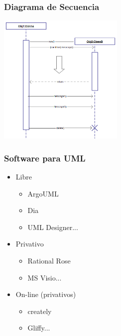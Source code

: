 \begin{frame}
\frametitle{Diagrama de Secuencia}

\begin{center}
\includegraphics[width=6cm]{figs/Sequence-diagram-UML.png}
\end{center}
  
\end{frame}

\begin{frame}
\frametitle{Software para UML}

\begin{itemize}
  \item Libre
  \begin{itemize}
    \item ArgoUML
    \item Dia
    \item UML Designer...
  \end{itemize}
  \item Privativo
    \begin{itemize}
    \item Rational Rose
    \item MS Visio...
  \end{itemize}
  \item On-line (privativos)
    \begin{itemize}
    \item creately
    \item Gliffy...
    \end{itemize}
\end{itemize}

\end{frame}

